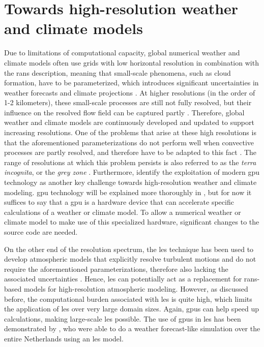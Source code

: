 \section{Towards high-resolution weather and climate models}
Due to limitations of computational capacity, global numerical weather and climate models often use grids with low horizontal resolution in combination with the \acrshort{rans} description, meaning that small-scale phenomena, such as cloud formation, have to be parameterized, which introduces significant uncertainties in weather forecasts and climate projections \citep{slingoUncertaintyWeatherClimate2011}. At higher resolutions (in the order of 1-2 kilometers), these small-scale processes are still not fully resolved, but their influence on the resolved flow field can be captured partly \citep{scharKilometerScaleClimateModels2020}. Therefore, global weather and climate models are continuously developed and updated to support increasing resolutions. One of the problems that arise at these high resolutions is that the aforementioned parameterizations do not perform well when convective processes are partly resolved, and therefore have to be adapted to this fact \citep{wyngaardNumericalModelingTerra2004}. The range of resolutions at which this problem persists is also referred to as the \emph{terra incognita}, or the \emph{grey zone} \citep{schalkwijkWeatherForecastingUsing2015,wyngaardNumericalModelingTerra2004}. Furthermore, \citet{scharKilometerScaleClimateModels2020} identify the exploitation of modern \acrlong{gpu} technology as another key challenge towards high-resolution weather and climate modeling. \acrshort{gpu} technology will be explained more thoroughly in , but for now it suffices to say that a \acrshort{gpu} is a hardware device that can accelerate specific calculations of a weather or climate model. To allow a numerical weather or climate model to make use of this specialized hardware, significant changes to the source code are needed.

On the other end of the resolution spectrum, the \acrshort{les} technique has been used to develop atmospheric models that explicitly resolve turbulent motions and do not require the aforementioned parameterizations, therefore also lacking the associated uncertainties \citep{schalkwijkWeatherForecastingUsing2015}. Hence, \acrshort{les} can potentially act as a replacement for \acrshort{rans}-based models for high-resolution atmospheric modeling. However, as discussed before, the computational burden associated with \acrshort{les} is quite high, which limits the application of \acrshort{les} over very large domain sizes. Again, \acrshort{gpu}s can help speed up calculations, making large-scale \acrshort{les} possible. The use of \acrshort{gpu}s in \acrshort{les} has been demonstrated by \citet{schalkwijkWeatherForecastingUsing2015}, who were able to do a weather forecast-like simulation over the entire Netherlands using an \acrshort{les} model.

